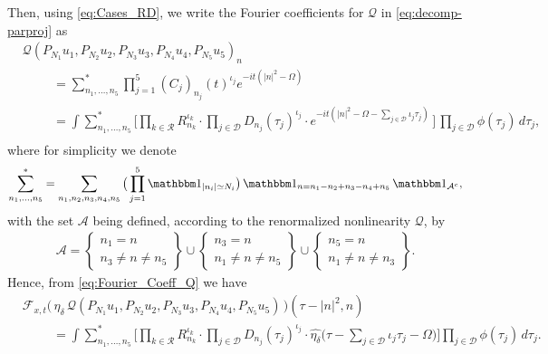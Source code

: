 \documentclass[11pt, xcolor = dvipsnames,reqno
]{amsart}
\theoremstyle{definition}
\theoremstyle{remark}
\begin{document}
Then, using \eqref{eq:Cases_RD}, 
we write the Fourier coefficients for $\mathcal{Q}$ in \eqref{eq:decomp-parproj} as
\begin{align}\label{eq:Fourier_Coeff_Q}
    & \mathcal{Q} (P_{N_1}u_1, P_{N_2}u_2, P_{N_3}u_3, P_{N_4}u_4, P_{N_5}u_5)_n \nonumber \\
    & \hspace{1cm}
    = 
    \sum_{n_1, \ldots, n_5}^*
    \prod_{j=1}^5(C_j)_{n_j}(t)^{\iota_j}
    e^{-it (|n|^2 - \Omega)} \\
    & \hspace{1cm}
    = 
    \int 
    \sum_{n_1, \ldots, n_5}^*
    \bigg[
    \prod_{k \in \mathcal R} R_{n_k}^{\iota_k} \cdot 
    \prod_{j \in \mathcal D} D_{n_j}(\tau_j)^{\iota_j} \cdot 
    e^{-it (|n|^2 - \Omega - \sum_{j \in \mathcal D} \iota_j \tau_j ) } \, 
    \bigg] \, 
    \prod_{j \in \mathcal D} \phi(\tau_j) \, d\tau_j,   \nonumber \\
\end{align}
where for simplicity we denote 
\begin{align}
    \sum_{n_1, \ldots, n_5}^* 
    = \sum_{n_1, n_2, n_3, n_4, n_5} 
    \big( \prod_{j=1}^5 \mathbbm 1_{|n_i| \simeq N_i} \big) \, 
    \mathbbm 1_{n = n_1 - n_2 + n_3 - n_4 + n_5} \, 
    \mathbbm 1_{\mathcal A^c}, 
\end{align}
with the set $\mathcal A$ being defined, according to the renormalized nonlinearity $\mathcal Q$, by
\begin{align}
    \mathcal A = 
    \left\{
    \begin{array}{l}
        n_1 = n  \\
        n_3 \neq n \neq n_5 
    \end{array}
    \right\}
    \cup 
    \left\{
    \begin{array}{l}
        n_3 = n  \\
        n_1 \neq n \neq n_5 
    \end{array}
    \right\}
    \cup 
    \left\{
    \begin{array}{l}
        n_5 = n  \\
        n_1 \neq n \neq n_3 
    \end{array}
    \right\}.
\end{align}
Hence, from \eqref{eq:Fourier_Coeff_Q} we have
\begin{align}
    & \mathcal F_{x,t}
    \big(  \, 
    \eta_\delta  \, \mathcal{Q} (P_{N_1}u_1, P_{N_2}u_2, P_{N_3}u_3, P_{N_4}u_4, P_{N_5}u_5)
    \, \big)
    (\tau - |n|^2,n) \\
    & \hspace{1cm}
    = 
    \int 
    \sum_{n_1, \ldots, n_5}^*
    \bigg[
    \prod_{k\in \mathcal R} R_{n_k}^{\iota_k} \cdot 
    \prod_{j \in \mathcal D} D_{n_j}(\tau_j)^{\iota_j} \cdot
    \widehat{\eta_\delta}
    \big(
    \tau - \sum_{j\in \mathcal D} \iota_j \tau_j  - \Omega
    \big)
    \bigg]
    \prod_{j \in \mathcal D} \phi(\tau_j) \, d\tau_j.
\end{align}
\end{document}
